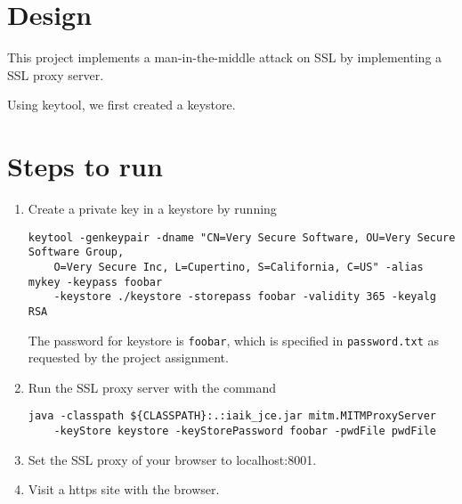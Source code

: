 
\usepackage{graphicx,amssymb,amsmath,enumerate}
\usepackage{courier}
\usepackage{color}
\usepackage{listings}
\usepackage{fancyvrb}
\usepackage{stmaryrd}

\oddsidemargin 0in
\evensidemargin 0in
\textwidth 6.5in
\topmargin -0.5in
\textheight 9.0in




\pagestyle{myheadings}  %

\section{Design}

This project implements a man-in-the-middle attack on SSL by implementing a SSL proxy server.

Using keytool, we first created a keystore. 
\section{Steps to run}
\begin{enumerate}[1.]
  \item Create a private key in a keystore by running 

\begin{lstlisting} 
keytool -genkeypair -dname "CN=Very Secure Software, OU=Very Secure Software Group, 
    O=Very Secure Inc, L=Cupertino, S=California, C=US" -alias mykey -keypass foobar 
    -keystore ./keystore -storepass foobar -validity 365 -keyalg RSA
\end{lstlisting}

  The password for keystore is \texttt{foobar}, which is specified in \texttt{password.txt} as requested by the project assignment.

\item Run the SSL proxy server with the command 
\begin{lstlisting}
java -classpath ${CLASSPATH}:.:iaik_jce.jar mitm.MITMProxyServer 
    -keyStore keystore -keyStorePassword foobar -pwdFile pwdFile
\end{lstlisting}

\item Set the SSL proxy of your browser to localhost:8001.
\item Visit a https site with the browser.
\end{enumerate}

